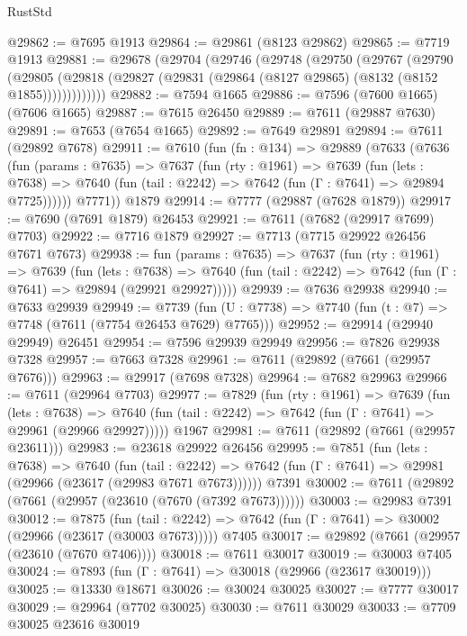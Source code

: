 \begin{lexlean}{RustStd}
\begin{coremodule}
@29862 := @7695 @1913
@29864 := @29861 (@8123 @29862)
@29865 := @7719 @1913
@29881 := @29678
    (@29704
      (@29746
        (@29748
          (@29750
            (@29767
              (@29790
                (@29805
                  (@29818 (@29827 (@29831 (@29864 (@8127 @29865) (@8132 (@8152 @1855)))))))))))))
@29882 := @7594 @1665
@29886 := @7596 (@7600 @1665) (@7606 @1665)
@29887 := @7615 @26450
@29889 := @7611 (@29887 @7630)
@29891 := @7653 (@7654 @1665)
@29892 := @7649 @29891
@29894 := @7611 (@29892 @7678)
@29911 := @7610
    (fun (fn : @134) =>
    @29889
      (@7633
        (@7636
          (fun (params : @7635) =>
          @7637
            (fun (rty : @1961) =>
            @7639
              (fun (lets : @7638) =>
              @7640 (fun (tail : @2242) => @7642 (fun (Γ : @7641) => @29894 @7725))))))
        @7771))
    @1879
@29914 := @7777 (@29887 (@7628 @1879))
@29917 := @7690 (@7691 @1879) @26453
@29921 := @7611 (@7682 (@29917 @7699) @7703)
@29922 := @7716 @1879
@29927 := @7713 (@7715 @29922 @26456 @7671 @7673)
@29938 := fun (params : @7635) =>
  @7637
    (fun (rty : @1961) =>
    @7639
      (fun (lets : @7638) =>
      @7640 (fun (tail : @2242) => @7642 (fun (Γ : @7641) => @29894 (@29921 @29927)))))
@29939 := @7636 @29938
@29940 := @7633 @29939
@29949 := @7739
    (fun (U : @7738) => @7740 (fun (t : @7) => @7748 (@7611 (@7754 @26453 @7629) @7765)))
@29952 := @29914 (@29940 @29949) @26451
@29954 := @7596 @29939 @29949
@29956 := @7826 @29938 @7328
@29957 := @7663 @7328
@29961 := @7611 (@29892 (@7661 (@29957 @7676)))
@29963 := @29917 (@7698 @7328)
@29964 := @7682 @29963
@29966 := @7611 (@29964 @7703)
@29977 := @7829
    (fun (rty : @1961) =>
    @7639
      (fun (lets : @7638) =>
      @7640 (fun (tail : @2242) => @7642 (fun (Γ : @7641) => @29961 (@29966 @29927)))))
    @1967
@29981 := @7611 (@29892 (@7661 (@29957 @23611)))
@29983 := @23618 @29922 @26456
@29995 := @7851
    (fun (lets : @7638) =>
    @7640
      (fun (tail : @2242) =>
      @7642 (fun (Γ : @7641) => @29981 (@29966 (@23617 (@29983 @7671 @7673))))))
    @7391
@30002 := @7611 (@29892 (@7661 (@29957 (@23610 (@7670 (@7392 @7673))))))
@30003 := @29983 @7391
@30012 := @7875
    (fun (tail : @2242) => @7642 (fun (Γ : @7641) => @30002 (@29966 (@23617 (@30003 @7673)))))
    @7405
@30017 := @29892 (@7661 (@29957 (@23610 (@7670 @7406))))
@30018 := @7611 @30017
@30019 := @30003 @7405
@30024 := @7893 (fun (Γ : @7641) => @30018 (@29966 (@23617 @30019)))
@30025 := @13330 @18671
@30026 := @30024 @30025
@30027 := @7777 @30017
@30029 := @29964 (@7702 @30025)
@30030 := @7611 @30029
@30033 := @7709 @30025 @23616 @30019

\end{coremodule}
\end{lexlean}
